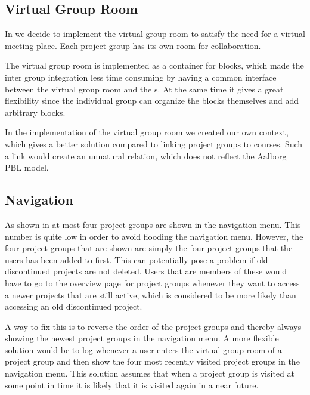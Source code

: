 \subsection{Virtual Group Room}
In  we decide to implement the virtual group room to satisfy the need for a virtual meeting place.
Each project group has its own room for collaboration. 

The virtual group room is implemented as a container for blocks, which made the inter group integration less time consuming by having a common interface between the virtual group room and the \detdeandrelaver{}s.
At the same time it gives a great flexibility since the individual group can organize the blocks themselves and add arbitrary blocks.

In the implementation of the virtual group room we created our own context, which gives a better solution compared to linking project groups to courses. 
Such a link would create an unnatural relation, which does not reflect the Aalborg PBL model.

\subsection{Navigation}
As shown in  at most four project groups are shown in the navigation menu.
This number is quite low in order to avoid flooding the navigation menu.
However, the four project groups that are shown are simply the four project groups that the users has been added to first.
This can potentially pose a problem if old discontinued projects are not deleted.
Users that are members of these would have to go to the overview page for project groups whenever they want to access a newer projects that are still active, which is considered to be more likely than accessing an old discontinued project.

A way to fix this is to reverse the order of the project groups and thereby always showing the newest project groups in the navigation menu.
A more flexible solution would be to log whenever a user enters the virtual group room of a project group and then show the four most recently visited project groups in the navigation menu.
This solution assumes that when a project group is visited at some point in time it is likely that it is visited again in a near future.

